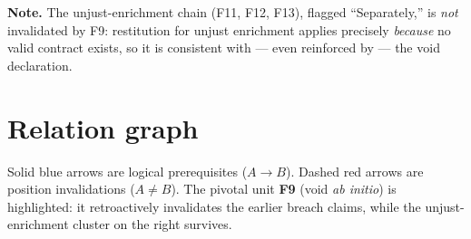 \documentclass[11pt]{article}
\begin{document}
\noindent
\textbf{Note.} The unjust-enrichment chain (F11, F12, F13), flagged
``Separately,'' is \emph{not} invalidated by F9: restitution for unjust
enrichment applies precisely \emph{because} no valid contract exists, so it is
consistent with --- even reinforced by --- the void declaration.

\section{Relation graph}

Solid blue arrows are logical prerequisites ($A \rightarrow B$). Dashed red
arrows are position invalidations ($A \neq B$). The pivotal unit \textbf{F9}
(void \emph{ab initio}) is highlighted: it retroactively invalidates the earlier
breach claims, while the unjust-enrichment cluster on the right survives.
\end{document}
